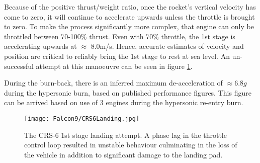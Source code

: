 Because of the positive thrust/weight ratio, once the rocket's vertical velocity has come to zero, it will continue to accelerate upwards unless the throttle is brought to zero. To make the process significantly more complex, that engine can only be throttled between 70-100\% thrust. Even with 70\% throttle, the 1st stage is accelerating upwards at $\approx$ 8.0m/s. Hence, accurate estimates of velocity and position are critical to reliably bring the 1st stage to rest at sea level. An un-successful attempt at this manoeuvre can be seen in figure \ref{fig:Kaboom}.

During the burn-back, there is an inferred maximum de-acceleration of $\approx 6.8 g$ during the hypersonic burn, based on published performance figures. This figure can be arrived based on use of 3 engines during the hypersonic re-entry burn. 


\begin{figure}[!htb] 
    \centering
    \texttt{[image: Falcon9/CRS6Landing.jpg]} 
    \caption{The CRS-6 1st stage landing attempt. A phase lag in the throttle control loop resulted in unstable behaviour culminating in the  loss of the vehicle in addition to significant damage to the landing pad.}
    \label{fig:Kaboom}
\end{figure}


